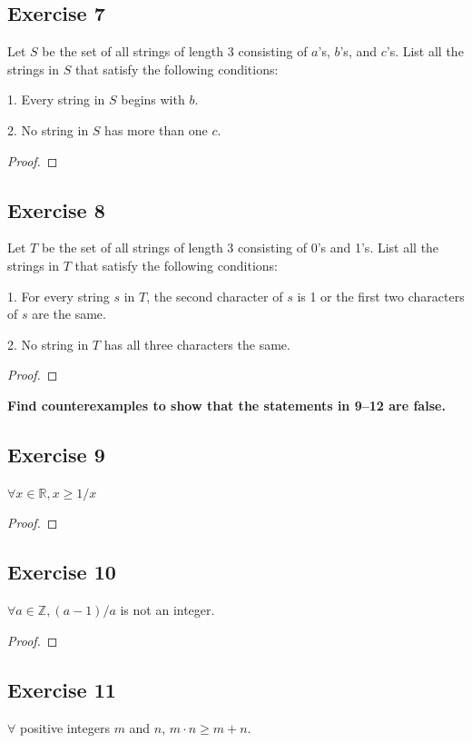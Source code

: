 \documentclass[14pt]{extarticle}
\newcommand{\R}{\mathbb{R}}
\newcommand{\Z}{\mathbb{Z}}
\newcommand{\fa}{\forall}
\begin{document}
\subsection{Exercise 7}
Let $S$ be the set of all strings of length 3 consisting of $a$’s, $b$’s, and $c$’s. List all the strings in $S$ that satisfy the following conditions:

1. Every string in $S$ begins with $b$.

2. No string in $S$ has more than one $c$.

\begin{proof}

\end{proof}

\subsection{Exercise 8}
Let $T$ be the set of all strings of length 3 consisting of 0’s and 1’s. List all the strings in $T$ that satisfy the following conditions:

1. For every string $s$ in $T$, the second character of $s$ is 1 or the first two characters of $s$ are the same.

2. No string in $T$ has all three characters the same.

\begin{proof}

\end{proof}

{\bf \color{cyan} Find counterexamples to show that the statements in 9–12 are false.}

\subsection{Exercise 9}
$\fa x \in \R, x \geq 1/x$

\begin{proof}

\end{proof}

\subsection{Exercise 10}
$\fa a \in \Z, (a-1)/a$ is not an integer.

\begin{proof}

\end{proof}

\subsection{Exercise 11}
$\fa$ positive integers $m$ and $n$, $m \cdot n \geq m + n$.
\end{document}
